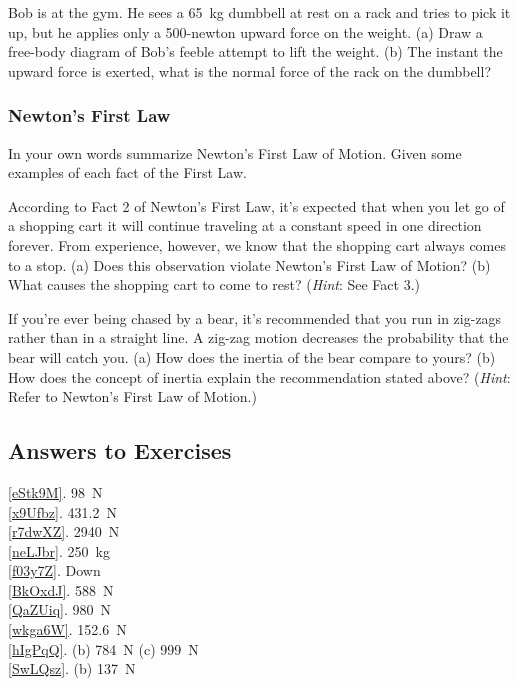 \documentclass[]{article}
\begin{document}
\begin{exercise} \label{SwLQsz}
    Bob is at the gym. He sees a \SI{65}{kg} dumbbell at rest on a rack and tries to pick it up, but he applies only a 500-newton upward force on the weight. (a) Draw a free-body diagram of Bob's feeble attempt to lift the weight. (b) The instant the upward force is exerted, what is the normal force of the rack on the dumbbell?
\end{exercise}

\subsubsection*{Newton's First Law}

\begin{exercise} \label{prob:fgm}
In your own words summarize Newton's First Law of Motion. Given some examples of each fact of the First Law. 
\end{exercise}


\begin{exercise} \label{WTFwXI}
According to Fact 2 of Newton's First Law, it's expected that when you let go of a shopping cart it will continue traveling at a constant speed in one direction forever. From experience, however, we know that the shopping cart always comes to a stop. (a) Does this observation violate Newton's First Law of Motion? (b) What causes the shopping cart to come to rest? (\textit{Hint}: See Fact 3.)
\end{exercise}

\begin{exercise} \label{MB3Xar}
If you’re ever being chased by a bear, it’s recommended that you run in zig-zags rather than in a straight line. A zig-zag motion decreases the probability that the bear will catch you. (a) How does the inertia of the bear compare to yours? (b) How does the concept of inertia explain the recommendation stated above? (\textit{Hint}: Refer to Newton's First Law of Motion.)
\end{exercise}

\subsection{Answers to Exercises}

\ref{eStk9M}. \SI{98}{N}\\
\ref{x9Ufbz}. \SI{431.2}{N}\\
\ref{r7dwXZ}. \SI{2940}{N}\\
\ref{neLJbr}. \SI{250}{kg}\\
\ref{f03y7Z}. Down\\
\ref{BkOxdJ}. \SI{588}{N}\\
\ref{QaZUiq}. \SI{980}{N}\\
\ref{wkga6W}. \SI{152.6}{N}\\
\ref{hIgPqQ}. (b) \SI{784}{N} \hspace{1em} (c) \SI{999}{N}\\
\ref{SwLQsz}. (b) \SI{137}{N}\\
\end{document}
